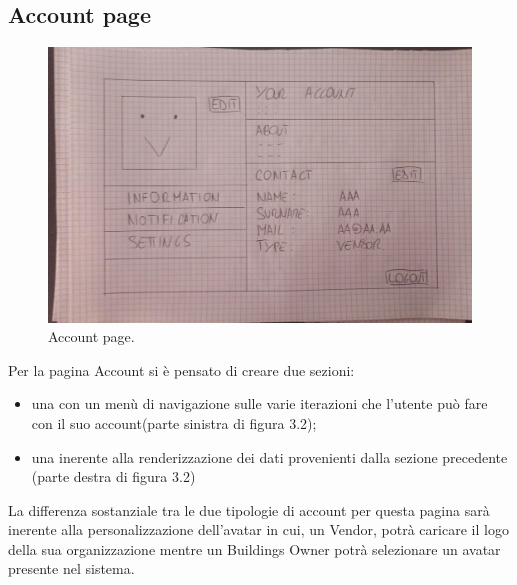 \documentclass{report}
\begin{document}
\subsection{Account page}
\begin{figure}[H]
  \includegraphics[width=\linewidth]{Account.jpeg}
  \caption{Account page.}
  \label{fig:Account page}
\end{figure}
\par Per la pagina Account si è pensato di creare due sezioni: 
\begin{itemize}
\item una con un menù di navigazione sulle varie iterazioni che l'utente può fare con il suo account(parte sinistra di figura 3.2);
\item una inerente alla renderizzazione dei dati provenienti dalla sezione precedente (parte destra di figura 3.2)
\end{itemize}
La differenza sostanziale tra le due tipologie di account per questa pagina sarà inerente alla personalizzazione dell'avatar in cui, un Vendor, potrà caricare il logo della sua organizzazione mentre un Buildings Owner potrà selezionare un avatar presente nel sistema.
\end{document}
